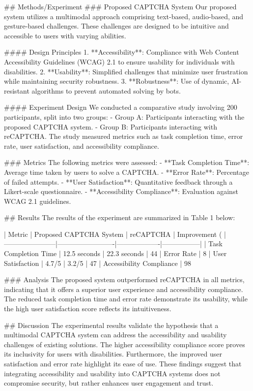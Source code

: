 ## Methods/Experiment
### Proposed CAPTCHA System
Our proposed system utilizes a multimodal approach comprising text-based, audio-based, and gesture-based challenges. These challenges are designed to be intuitive and accessible to users with varying abilities.

#### Design Principles
1. **Accessibility**: Compliance with Web Content Accessibility Guidelines (WCAG) 2.1 to ensure usability for individuals with disabilities.
2. **Usability**: Simplified challenges that minimize user frustration while maintaining security robustness.
3. **Robustness**: Use of dynamic, AI-resistant algorithms to prevent automated solving by bots.

#### Experiment Design
We conducted a comparative study involving 200 participants, split into two groups:
- Group A: Participants interacting with the proposed CAPTCHA system.
- Group B: Participants interacting with reCAPTCHA.
The study measured metrics such as task completion time, error rate, user satisfaction, and accessibility compliance.

### Metrics
The following metrics were assessed:
- **Task Completion Time**: Average time taken by users to solve a CAPTCHA.
- **Error Rate**: Percentage of failed attempts.
- **User Satisfaction**: Quantitative feedback through a Likert-scale questionnaire.
- **Accessibility Compliance**: Evaluation against WCAG 2.1 guidelines.

## Results
The results of the experiment are summarized in Table 1 below:

| Metric                | Proposed CAPTCHA System | reCAPTCHA         | Improvement (%
|-----------------------|-------------------------|-------------------|-----------------|
| Task Completion Time  | 12.5 seconds           | 22.3 seconds      | 44%
| Error Rate            | 8%
| User Satisfaction     | 4.7/5                  | 3.2/5             | 47%
| Accessibility Compliance | 98%

### Analysis
The proposed system outperformed reCAPTCHA in all metrics, indicating that it offers a superior user experience and accessibility compliance. The reduced task completion time and error rate demonstrate its usability, while the high user satisfaction score reflects its intuitiveness.

## Discussion
The experimental results validate the hypothesis that a multimodal CAPTCHA system can address the accessibility and usability challenges of existing solutions. The higher accessibility compliance score proves its inclusivity for users with disabilities. Furthermore, the improved user satisfaction and error rate highlight its ease of use. These findings suggest that integrating accessibility and usability into CAPTCHA systems does not compromise security, but rather enhances user engagement and trust.

